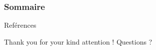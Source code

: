 \documentclass[notes,handout,compress]{beamer}
\begin{document}
\begin{frame}
  \frametitle{Sommaire}
  \tableofcontents
\end{frame}






% 

% 

% 




\appendix   %


\begin{frame}[plain,t]{Reférences}
  \tiny
  \printbibliography
\end{frame}


  \begin{frame}[plain]
    \Large
    \begin{exampleblock}{\centering \LARGE Thank you for your kind attention \Large \Smiley{} !}\LARGE
      \centering
      Questions ?
    \end{exampleblock}

  \end{frame}
\end{document}
